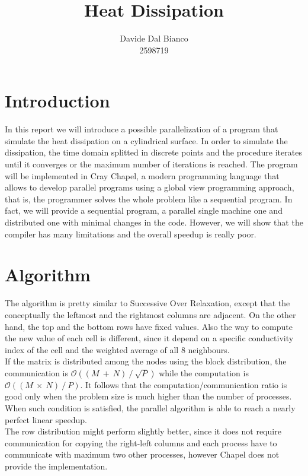 \documentclass{article}
\title{Heat Dissipation}
\author{Davide Dal Bianco \\ 2598719}
\begin{document}
\maketitle

\section{Introduction} \label{sec:introduction}
In this report we will introduce a possible parallelization of a program that simulate the heat dissipation on a cylindrical surface. In order to simulate the dissipation, the time domain splitted in discrete points and the procedure iterates until it converges or the maximum number of iterations is reached. The program will be implemented in Cray Chapel, a modern programming language that allows to develop parallel programs using a global view programming approach, that is, the programmer solves the whole problem like a sequential program. In fact, we will provide a sequential program, a parallel single machine one and distributed one with minimal changes in the code. However, we will show that the compiler has many limitations and the overall speedup is really poor.

\section{Algorithm} \label{sec:algorithm}
The algorithm is pretty similar to Successive Over Relaxation, except that the conceptually the leftmost and the rightmost columns are adjacent. On the other hand, the top and the bottom rows have fixed values. Also the way to compute the new value of each cell is different, since it depend on a specific conductivity index of the cell and the weighted average of all 8 neighbours. \\
If the matrix is distributed among the nodes using the block distribution, the communication is $\mathcal{O}((M~+~N)~/~\sqrt{P})$ while the computation is $\mathcal{O}((M~\times~N)~/~P)$. It follows that the computation/communication ratio is good only when the problem size is much higher than the number of processes. When such condition is satisfied, the parallel algorithm is able to reach a nearly perfect linear speedup. \\
The row distribution might perform slightly better, since it does not require communication for copying the right-left columns and each process have to communicate with maximum two other processes, however Chapel does not provide the implementation.
\end{document}
